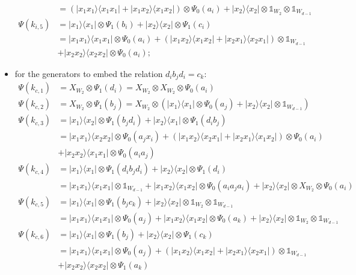 \documentclass[11pt,letterpaper]{article}
\newcommand{\ketbra}[2]{|#1\rangle\langle#2|}
\newcommand{\x}{\otimes}
\newcommand{\1}{\mathbb{1}}
\theoremstyle{definition}
\begin{document}
\begin{itemize}
\begin{align}
	&=(\ketbra{x_1x_1}{x_1x_1}+  \ketbra{x_1x_2}{x_1x_2}) \x \Psi_0(a_i) +  \ketbra{x_2}{x_2} \x \1_{W_2} \x \1_{W_{d-1}}\\
	\Psi(k_{i,5}) &= \ketbra{x_1}{x_1} \x \Psi_1(b_i) + \ketbra{x_2}{x_2} \x \Psi_1(c_i) \\
	&=\ketbra{x_1x_1}{x_1x_1} \x \Psi_0(a_i) + (\ketbra{x_1x_2}{x_1x_2} + \ketbra{x_2x_1}{x_2x_1}) \x \1_{W_{d-1}}\\
	&+ \ketbra{x_2x_2}{x_2x_2} \x \Psi_0(a_i);
\end{align}
\item for the generators to embed the relation $d_i b_j d_i = c_k$:
\begin{align*}
	\Psi(k_{c,1}) &= X_{W_2} \x \Psi_1(d_i) = X_{W_2} \x X_{W_2} \x \Psi_0(a_{i}) \\
	\Psi(k_{c,2}) &= X_{W_2} \x \Psi_1(b_j) = X_{W_2} \x (\ketbra{x_1}{x_1} \x \Psi_0(a_j) + \ketbra{x_2}{x_2} \x \1_{W_{d-1}})\\
	\Psi(k_{c,3}) &= \ketbra{x_1}{x_2} \x  \Psi_1(b_jd_i) + \ketbra{x_2}{x_1} \x \Psi_1(d_ib_j)\\
	&= \ketbra{x_1x_1}{x_2x_2} \x \Psi_0(a_{j}x_{i}) + (\ketbra{x_1x_2}{x_2x_1} + \ketbra{x_2x_1}{x_1x_2}) \x \Psi_0(a_i)\\
	&+  \ketbra{x_2x_2}{x_1x_1} \x \Psi_0(a_{i}a_{j}) \\
	\Psi(k_{c,4}) &= \ketbra{x_1}{x_1} \x \Psi_1(d_ib_jd_i) + \ketbra{x_2}{x_2} \x  \Psi_1(d_i)\\
	&= \ketbra{x_1x_1}{x_1x_1} \x \1_{W_{d-1}} + \ketbra{x_1x_2}{x_1x_2} \x \Psi_0(a_ia_ja_i) + \ketbra{x_2}{x_2} \x X_{W_2} \x \Psi_0(a_i)\\
	\Psi(k_{c,5}) &=  \ketbra{x_1}{x_1} \x \Psi_1(b_jc_k) + \ketbra{x_2}{x_2} \x \1_{W_2} \x \1_{W_{d-1}}\\
	&=  \ketbra{x_1x_1}{x_1x_1} \x \Psi_0(a_{j}) +  \ketbra{x_1x_2}{x_1x_2} \x \Psi_0(a_{k}) +  \ketbra{x_2}{x_2} \x \1_{W_2} \x \1_{W_{d-1}}\\
	\Psi(k_{c,6}) &= \ketbra{x_1}{x_1} \x \Psi_1(b_j) + \ketbra{x_2}{x_2} \x \Psi_1(c_{k})\\
	&=  \ketbra{x_1x_1}{x_1x_1} \x \Psi_0(a_{j}) + (\ketbra{x_1x_2}{x_1x_2} + \ketbra{x_2x_1}{x_2x_1})\x\1_{W_{d-1}}\\
	 &+ \ketbra{x_2x_2}{x_2x_2} \x \Psi_1(a_{k})
\end{align*}
\end{itemize}


\end{document}
